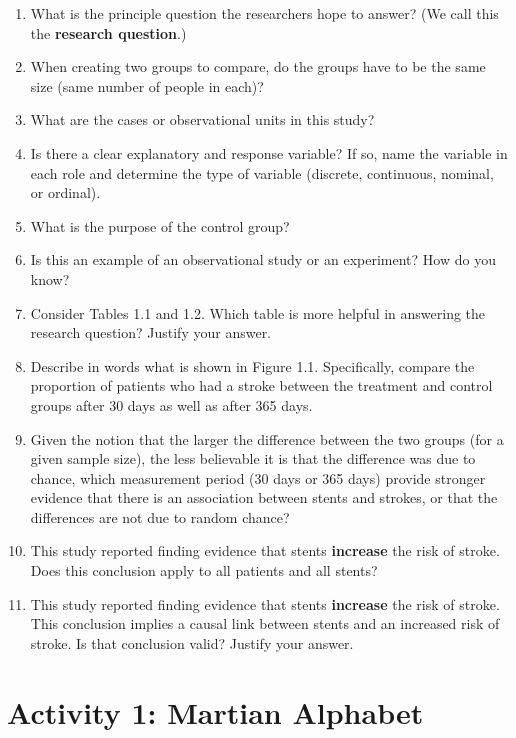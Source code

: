 \documentclass[
]{report}
\newcommand{\rgs}{\vspace{12pt}} %
\begin{document}
\begin{enumerate}
\def\labelenumi{\arabic{enumi})}
\item
  What is the principle question the researchers hope to answer? (We call this the \textbf{research question}.)
  \rgs
  \rgs
\item
  When creating two groups to compare, do the groups have to be the same size (same number of people in each)?
  \rgs
  \rgs
\item
  What are the cases or observational units in this study?
  \rgs
  \rgs
\item
  Is there a clear explanatory and response variable? If so, name the variable in each role and determine the type of variable (discrete, continuous, nominal, or ordinal).
  \rgs
  \rgs
\item
  What is the purpose of the control group?
  \rgs
  \rgs
\item
  Is this an example of an observational study or an experiment? How do you know?
  \rgs
  \rgs
\item
  Consider Tables 1.1 and 1.2. Which table is more helpful in answering the research question? Justify your answer.
  \rgs
  \rgs
\item
  Describe in words what is shown in Figure 1.1. Specifically, compare the proportion of patients who had a stroke between the treatment and control groups after 30 days as well as after 365 days.
  \rgs
  \rgs
\item
  Given the notion that the larger the difference between the two groups (for a given sample size), the less believable it is that the difference was due to chance, which measurement period (30 days or 365 days) provide stronger evidence that there is an association between stents and strokes, or that the differences are not due to random chance?
  \rgs
  \rgs
\item
  This study reported finding evidence that stents \textbf{increase} the risk of stroke. Does this conclusion apply to all patients and all stents?
  \rgs
  \rgs
\item
  This study reported finding evidence that stents \textbf{increase} the risk of stroke. This conclusion implies a causal link between stents and an increased risk of stroke. Is that conclusion valid? Justify your answer.
\end{enumerate}

\hypertarget{activity-1-martian-alphabet}{%
\chapter{Activity 1: Martian Alphabet}\label{activity-1-martian-alphabet}}
\end{document}
